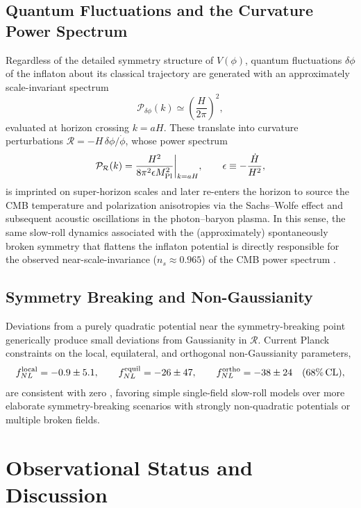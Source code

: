 \documentclass[11pt]{article}
\begin{document}
\subsection{Quantum Fluctuations and the Curvature Power Spectrum}

Regardless of the detailed symmetry structure of $V(\phi)$, quantum fluctuations $\delta\phi$ of the inflaton about its classical trajectory are generated with an approximately scale-invariant spectrum
\begin{equation}
\mathcal{P}_{\delta\phi}(k) \simeq \left(\frac{H}{2\pi}\right)^2,
\end{equation}
evaluated at horizon crossing $k = aH$. These translate into curvature perturbations $\mathcal{R} = -H\,\delta\phi/\dot\phi$, whose power spectrum
\begin{equation}
\mathcal{P}_{\mathcal{R}}(k) = \frac{H^2}{8\pi^2 \epsilon M_{\rm Pl}^2}\bigg|_{k=aH},
\qquad \epsilon \equiv -\frac{\dot H}{H^2},
\end{equation}
is imprinted on super-horizon scales and later re-enters the horizon to source the CMB temperature and polarization anisotropies via the Sachs--Wolfe effect and subsequent acoustic oscillations in the photon--baryon plasma. In this sense, the same slow-roll dynamics associated with the (approximately) spontaneously broken symmetry that flattens the inflaton potential is directly responsible for the observed near-scale-invariance ($n_s \approx 0.965$) of the CMB power spectrum \citep{Planck2018Inflation}.

\subsection{Symmetry Breaking and Non-Gaussianity}

Deviations from a purely quadratic potential near the symmetry-breaking point generically produce small deviations from Gaussianity in $\mathcal{R}$. Current Planck constraints on the local, equilateral, and orthogonal non-Gaussianity parameters,
\begin{equation}
f_{NL}^{\rm local} = -0.9 \pm 5.1, \qquad f_{NL}^{\rm equil} = -26 \pm 47, \qquad f_{NL}^{\rm ortho} = -38 \pm 24 \quad (68\% \, {\rm CL}),
\end{equation}
are consistent with zero \citep{Planck2019NG}, favoring simple single-field slow-roll models over more elaborate symmetry-breaking scenarios with strongly non-quadratic potentials or multiple broken fields.

\section{Observational Status and Discussion}
\end{document}
